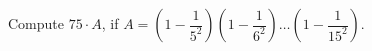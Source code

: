 Compute $75 \cdot A$, if $A=\left(1-\dfrac{1}{5^{2}}\right)\left(1-\dfrac{1}{6^{2}}\right)\ldots\left(1-\dfrac{1}{15^{2}}\right)$.
